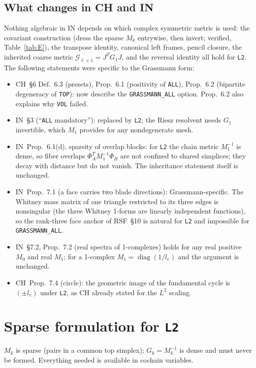 \documentclass[11pt]{article}
\theoremstyle{definition}
\theoremstyle{plain}
\theoremstyle{remark}
\newcommand{\Tr}{^{T}}
\newcommand{\ttt}[1]{\texttt{#1}}
\newcommand{\diag}{\operatorname{diag}}
\begin{document}
\subsection{What changes in CH and IN}
Nothing algebraic in IN depends on which complex symmetric metric is used: the covariant construction (dress the sparse \(M_k\) entrywise, then invert; verified, Table~\ref{tab:E}), the transpose identity, canonical left frames, pencil closure, the inherited coarse metric \(\mathcal G_{\ell+1}=J\Tr G_1J\), and the reversal identity all hold for \ttt{L2}. The following statements were specific to the Grassmann form:
\begin{itemize}[nosep]
\item CH~\S6 Def.~6.3 (presets), Prop.~6.1 (positivity of \ttt{ALL}), Prop.~6.2 (bipartite degeneracy of \ttt{TOP}): now describe the \ttt{GRASSMANN\_ALL} option. Prop.~6.2 also explains why \ttt{VOL} failed.
\item IN~\S3 (``\ttt{ALL} mandatory''): replaced by \ttt{L2}; the Riesz resolvent needs \(G_1\) invertible, which \(M_1\) provides for any nondegenerate mesh.
\item IN~Prop.~6.1(d), sparsity of overlap blocks: for \ttt{L2} the chain metric \(M_1^{-1}\) is dense, so fiber overlaps \(\Phi_A\Tr M_1^{-1}\Phi_B\) are not confined to shared simplices; they decay with distance but do not vanish. The inheritance statement itself is unchanged.
\item IN~Prop.~7.1 (a face carries two blade directions): Grassmann-specific. The Whitney mass matrix of one triangle restricted to its three edges is nonsingular (the three Whitney 1-forms are linearly independent functions), so the rank-three face anchor of RSF~\S10 is natural for \ttt{L2} and impossible for \ttt{GRASSMANN\_ALL}.
\item IN~\S7.2, Prop.~7.2 (real spectra of 1-complexes) holds for any real positive \(M_0\) and real \(M_1\); for a 1-complex \(M_1=\diag(1/l_e)\) and the argument is unchanged.
\item CH~Prop.~7.4 (circle): the geometric image of the fundamental cycle is \((\pm l_e)\) under \ttt{L2}, as CH already stated for the \(L^{2}\) scaling.
\end{itemize}

\section{Sparse formulation for \ttt{L2}}\label{sec:sparse}

\(M_k\) is sparse (pairs in a common top simplex); \(G_k=M_k^{-1}\) is dense and must never be formed. Everything needed is available in cochain variables.
\end{document}
